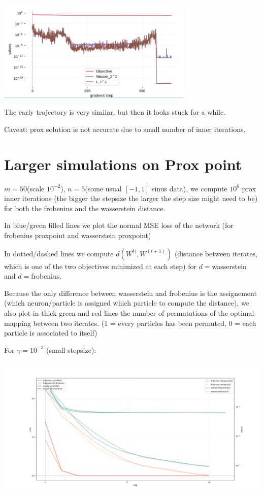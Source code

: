 \includegraphics[width=0.7\textwidth]{imgs/tau10_graph_wasser.png}

The early trajectory is very similar, but then it looks stuck for a while.

Caveat: prox solution is not accurate due to small number of inner iterations.

\section{Larger simulations on Prox point}

$m = 50$(scale $10^{-2}$), $n = 5$(some usual $[-1, 1]$ sinus data), we compute $10^6$ prox inner iterations (the bigger the stepsize the larger the step size might need to be) for both the frobenius and the wasserstein distance. 

In blue/green filled lines we plot the normal MSE loss of the network (for frobenius proxpoint and wasserstein proxpoint)

In dotted/dashed lines we compute $d(W^{t)}, W^{(t+1)})$ (distance between iterates, which is one of the two objectives minimized at each step) for $d=$wasserstein and $d=$frobenius.

Because the only difference between wasserstein and frobenius is the assignement (which neuron/particle is assigned which particle to compute the distance), we also plot in thick green and red lines the number of permutations of the optimal mapping between two iterates. (1 = every particles has been permuted, 0 = each particle is associated to itself)

For $\gamma = 10^{-3}$ (small stepsize):

\includegraphics[width=1.0\textwidth]{imgs/petit_pas_10steps.png}

